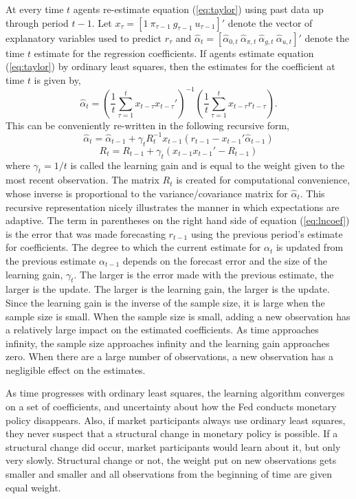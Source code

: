 \documentclass[12pt]{article}
\newcommand{\beq}{\begin{equation}}
\newcommand{\eeq}{\end{equation}}
\begin{document}
At every time $t$ agents re-estimate equation (\ref{eq:taylor}) using past data up through period $t-1$.  Let $x_{\tau} = [1~ \pi_{\tau-1}~ g_{\tau-1}~ u_{\tau-1}]'$ denote the vector of explanatory variables used to predict $r_{\tau}$ and $\hat{\alpha}_t = [\hat{\alpha}_{0,t}~ \hat{\alpha}_{\pi,t}~  \hat{\alpha}_{g,t}~  \hat{\alpha}_{u,t}]'$ denote the time $t$ estimate for the regression coefficients.  If agents estimate equation (\ref{eq:taylor}) by ordinary least squares, then the estimates for the coefficient at time $t$ is given by,
\beq \label{eq:ols} \hat{\alpha}_t = \left( \frac{1}{t} \sum_{\tau=1}^{t} x_{t-\tau} x_{t-\tau}' \right)^{-1}  \left( \frac{1}{t} \sum_{\tau=1}^{t} x_{t-\tau}  r_{t-\tau} \right). \eeq
This can be conveniently re-written in the following recursive form,
\beq \label{eq:lncoef} \hat{\alpha}_t = \hat{\alpha}_{t-1} + \gamma_t  R_t^{-1} x_{t-1} \left(r_{t-1} - x_{t-1}'\hat{\alpha}_{t-1}\right) \eeq
\beq \label{eq:lnR} R_t = R_{t-1} + \gamma_t \left(x_{t-1} x_{t-1}' - R_{t-1}\right) \eeq
where $\gamma_{t} = 1/t$ is called the learning gain and is equal to the weight given to the most recent observation.  The matrix $R_t$ is created for computational convenience, whose inverse is proportional to the variance/covariance matrix for $\hat{\alpha}_t$.   This recursive representation nicely illustrates the manner in which expectations are adaptive.  The term in parentheses on the right hand side of equation (\ref{eq:lncoef}) is the error that was made forecasting $r_{t-1}$ using the previous period's estimate for coefficients.  The degree to which the current estimate for $\alpha_t$ is updated from the previous estimate $\alpha_{t-1}$ depends on the forecast error and the size of the learning gain, $\gamma_t$.  The larger is the error made with the previous estimate, the larger is the update.  The larger is the learning gain, the larger is the update.  Since the learning gain is the inverse of the sample size, it is large when the sample size is small.  When the sample size is small, adding a new observation has a relatively large impact on the estimated coefficients.  As time approaches infinity, the sample size approaches infinity and the learning gain approaches zero.  When there are a large number of observations, a new observation has a negligible effect on the estimates.
 
As time progresses with ordinary least squares, the learning algorithm converges on a set of coefficients, and uncertainty about how the Fed conducts monetary policy disappears.  Also, if market participants always use ordinary least squares, they never suspect that a structural change in monetary policy is possible.  If a structural change did occur, market participants would learn about it, but only very slowly.  Structural change or not, the weight put on new observations gets smaller and smaller and all observations from the beginning of time are given equal weight.  
\end{document}
